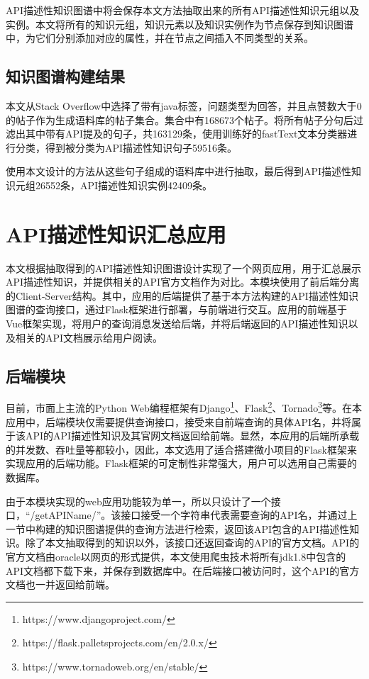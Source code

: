 API描述性知识图谱中将会保存本文方法抽取出来的所有API描述性知识元组以及实例。本文将所有的知识元组，知识元素以及知识实例作为节点保存到知识图谱中，为它们分别添加对应的属性，并在节点之间插入不同类型的关系。

\subsection{知识图谱构建结果}
本文从Stack Overflow中选择了带有java标签，问题类型为回答，并且点赞数大于0的帖子作为生成语料库的帖子集合。集合中有168673个帖子。将所有帖子分句后过滤出其中带有API提及的句子，共163129条，使用训练好的fastText文本分类器进行分类，得到被分类为API描述性知识句子59516条。

使用本文设计的方法从这些句子组成的语料库中进行抽取，最后得到API描述性知识元组26552条，API描述性知识实例42409条。

\section{API描述性知识汇总应用}
本文根据抽取得到的API描述性知识图谱设计实现了一个网页应用，用于汇总展示API描述性知识，并提供相关的API官方文档作为对比。本模块使用了前后端分离的Client-Server结构。其中，应用的后端提供了基于本方法构建的API描述性知识图谱的查询接口，通过Flask框架进行部署，与前端进行交互。应用的前端基于Vue框架实现，将用户的查询消息发送给后端，并将后端返回的API描述性知识以及相关的API文档展示给用户阅读。

\subsection{后端模块}
目前，市面上主流的Python Web编程框架有Django\footnote{https://www.djangoproject.com/}、Flask\footnote{https://flask.palletsprojects.com/en/2.0.x/}、Tornado\footnote{https://www.tornadoweb.org/en/stable/}等。在本应用中，后端模块仅需要提供查询接口，接受来自前端查询的具体API名，并将属于该API的API描述性知识及其官网文档返回给前端。显然，本应用的后端所承载的并发数、吞吐量等都较小，因此，本文选用了适合搭建微小项目的Flask框架来实现应用的后端功能。Flask框架的可定制性非常强大，用户可以选用自己需要的数据库。

由于本模块实现的web应用功能较为单一，所以只设计了一个接口，“/getAPIName/”。该接口接受一个字符串代表需要查询的API名，并通过上一节中构建的知识图谱提供的查询方法进行检索，返回该API包含的API描述性知识。除了本文抽取得到的知识以外，该接口还返回查询的API的官方文档。API的官方文档由oracle以网页的形式提供，本文使用爬虫技术将所有jdk1.8中包含的API文档都下载下来，并保存到数据库中。在后端接口被访问时，这个API的官方文档也一并返回给前端。

